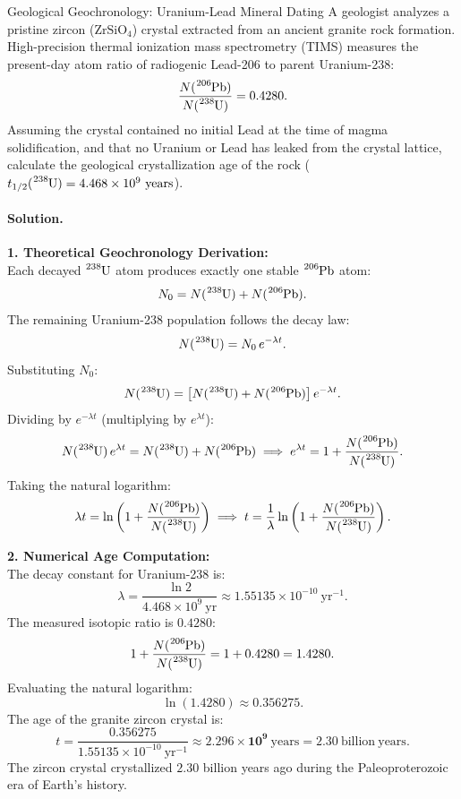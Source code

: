 \begin{workedexample}{Geological Geochronology: Uranium-Lead Mineral Dating}
A geologist analyzes a pristine zircon ($\mathrm{ZrSiO_4}$) crystal extracted from an ancient granite rock formation. High-precision thermal ionization mass spectrometry (TIMS) measures the present-day atom ratio of radiogenic Lead-206 to parent Uranium-238:
\[
\frac{N(\ce{^{206}Pb})}{N(\ce{^{238}U})} = 0.4280.
\]
Assuming the crystal contained no initial Lead at the time of magma solidification, and that no Uranium or Lead has leaked from the crystal lattice, calculate the geological crystallization age of the rock ($t_{1/2}(\ce{^{238}U}) = 4.468 \times 10^9\ \mathrm{years}$).

\paragraph{Solution.}
\textbf{1. Theoretical Geochronology Derivation:}\\
Each decayed $\ce{^{238}U}$ atom produces exactly one stable $\ce{^{206}Pb}$ atom:
\[
N_0 = N(\ce{^{238}U}) + N(\ce{^{206}Pb}).
\]
The remaining Uranium-238 population follows the decay law:
\[
N(\ce{^{238}U}) = N_0\,e^{-\lambda t}.
\]
Substituting $N_0$:
\[
N(\ce{^{238}U}) = \left[ N(\ce{^{238}U}) + N(\ce{^{206}Pb}) \right] e^{-\lambda t}.
\]
Dividing by $e^{-\lambda t}$ (multiplying by $e^{\lambda t}$):
\[
N(\ce{^{238}U})\,e^{\lambda t} = N(\ce{^{238}U}) + N(\ce{^{206}Pb}) \implies e^{\lambda t} = 1 + \frac{N(\ce{^{206}Pb})}{N(\ce{^{238}U})}.
\]
Taking the natural logarithm:
\[
\lambda t = \ln\left( 1 + \frac{N(\ce{^{206}Pb})}{N(\ce{^{238}U})} \right) \implies t = \frac{1}{\lambda} \ln\left( 1 + \frac{N(\ce{^{206}Pb})}{N(\ce{^{238}U})} \right).
\]

\textbf{2. Numerical Age Computation:}\\
The decay constant for Uranium-238 is:
\[
\lambda = \frac{\ln 2}{4.468 \times 10^9\ \mathrm{yr}} \approx 1.55135 \times 10^{-10}\ \mathrm{yr^{-1}}.
\]
The measured isotopic ratio is $0.4280$:
\[
1 + \frac{N(\ce{^{206}Pb})}{N(\ce{^{238}U})} = 1 + 0.4280 = 1.4280.
\]
Evaluating the natural logarithm:
\[
\ln(1.4280) \approx 0.356275.
\]
The age of the granite zircon crystal is:
\[
t = \frac{0.356275}{1.55135 \times 10^{-10}\ \mathrm{yr^{-1}}} \approx \mathbf{2.296 \times 10^9\ \mathrm{years}} = \mathbf{2.30\ \mathrm{billion\ years}}.
\]
The zircon crystal crystallized $2.30$ billion years ago during the Paleoproterozoic era of Earth's history.
\end{workedexample}
